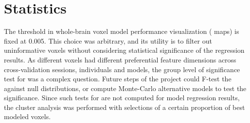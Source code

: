 


\section{Statistics}

The threshold in whole-brain voxel model performance visualization ( maps) is fixed at 0.005. This choice was arbitrary, and its utility is to filter out uninformative voxels without considering statistical significance of the regression results. As different voxels had different preferential feature dimensions across cross-validation sessions, individuals and models, the group level of significance test for  was a complex question. Future steps of the project could F-test the  against null distributions, or compute Monte-Carlo alternative models to test the significance. Since such tests for  are not computed for model regression results, the cluster analysis was performed with selections of a certain proportion of best modeled voxels.

